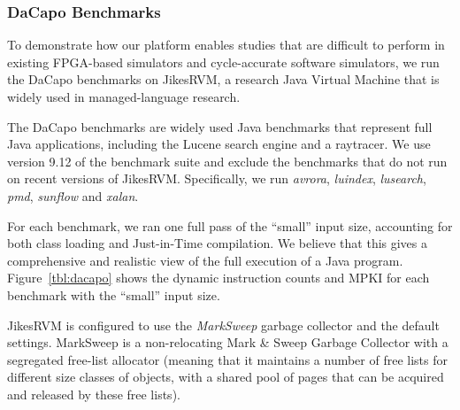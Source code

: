\subsubsection{DaCapo Benchmarks}

\begin{table}
\begin{center}
%
\end{center}
\caption{Dynamic instruction counts and MPKI for the DaCapo benchmarks with the ``small'' input size}
\label{tbl:dacapo}
\end{table}

To demonstrate how our platform enables studies that are difficult to perform in existing FPGA-based simulators and cycle-accurate software simulators, we run the DaCapo benchmarks on JikesRVM, a research Java Virtual Machine that is widely used in managed-language research.

The DaCapo benchmarks are widely used Java benchmarks that represent full Java applications, including the Lucene search engine and a raytracer. We use version 9.12 of the benchmark suite and exclude the benchmarks that do not run on recent versions of JikesRVM. Specifically, we run \emph{avrora}, \emph{luindex}, \emph{lusearch}, \emph{pmd}, \emph{sunflow} and \emph{xalan}.

For each benchmark, we ran one full pass of the ``small'' input size, accounting for both class loading and Just-in-Time compilation. We believe that this gives a comprehensive and realistic view of the full execution of a Java program. Figure~\ref{tbl:dacapo} shows the dynamic instruction counts and MPKI for each benchmark with the ``small'' input size.

JikesRVM is configured to use the \emph{MarkSweep} garbage collector and the default settings. MarkSweep is a non-relocating Mark \& Sweep Garbage Collector with a segregated free-list allocator (meaning that it maintains a number of free lists for different size classes of objects, with a shared pool of pages that can be acquired and released by these free lists).
